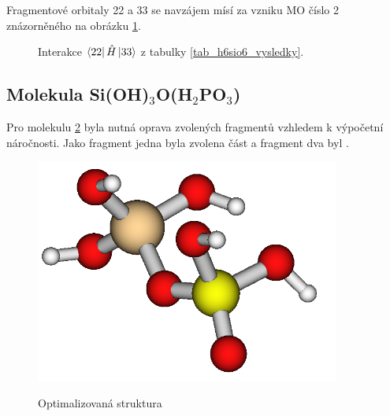 \documentclass[
  digital, %
  table,   %
  lof,     %
  lot,     %
]{fithesis3}
\begin{document}
  Fragmentové orbitaly  22 a 33 se navzájem mísí za vzniku MO číslo 2 znázorněného na obrázku \ref{obr_h6sio6_vysledky_III}.   
\begin{figure}
\begin{center}
\caption{Interakce $\bra{22}{\hat{H}}\ket{33}$ z tabulky \ref{tab_h6sio6_vysledky}.}

\label{obr_h6sio6_vysledky_III}\end{center}
\end{figure} 
 \subsection{Molekula Si(OH)$_3$O(H$_2$PO$_3$)}
 Pro molekulu  \ref{obr_h3sio4_h2po3} byla nutná oprava zvolených fragmentů vzhledem k výpočetní náročnosti. Jako fragment jedna byla zvolena část  a fragment dva byl .  

  \begin{figure}[h]
\caption{Optimalizovaná struktura  }
  \center
  \includegraphics[width=10cm]{obr_h3sio4_h2po3.png}
  \label{obr_h3sio4_h2po3}
  \end{figure}
\end{document}
